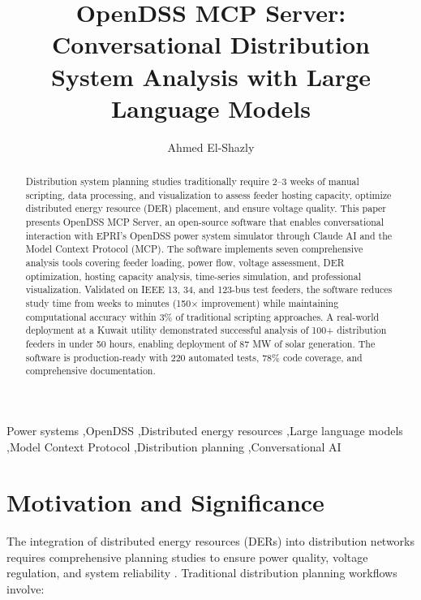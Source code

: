 \documentclass[review]{elsarticle}
\begin{document}
\begin{frontmatter}

\title{OpenDSS MCP Server: Conversational Distribution System Analysis with Large Language Models}

\author[addr1]{Ahmed El-Shazly}


\address[addr1]{Independent Researcher, Kuwait}

\begin{abstract}
Distribution system planning studies traditionally require 2--3 weeks of manual scripting, data processing, and visualization to assess feeder hosting capacity, optimize distributed energy resource (DER) placement, and ensure voltage quality. This paper presents OpenDSS MCP Server, an open-source software that enables conversational interaction with EPRI's OpenDSS power system simulator through Claude AI and the Model Context Protocol (MCP). The software implements seven comprehensive analysis tools covering feeder loading, power flow, voltage assessment, DER optimization, hosting capacity analysis, time-series simulation, and professional visualization. Validated on IEEE 13, 34, and 123-bus test feeders, the software reduces study time from weeks to minutes (150× improvement) while maintaining computational accuracy within 3\% of traditional scripting approaches. A real-world deployment at a Kuwait utility demonstrated successful analysis of 100+ distribution feeders in under 50 hours, enabling deployment of 87 MW of solar generation. The software is production-ready with 220 automated tests, 78\% code coverage, and comprehensive documentation.
\end{abstract}

\begin{keyword}
Power systems \sep OpenDSS \sep Distributed energy resources \sep Large language models \sep Model Context Protocol \sep Distribution planning \sep Conversational AI
\end{keyword}

\end{frontmatter}

\linenumbers

\section{Motivation and Significance}
\label{sec:motivation}

The integration of distributed energy resources (DERs) into distribution networks requires comprehensive planning studies to ensure power quality, voltage regulation, and system reliability \cite{lopes2007integrating}. Traditional distribution planning workflows involve:
\end{document}

